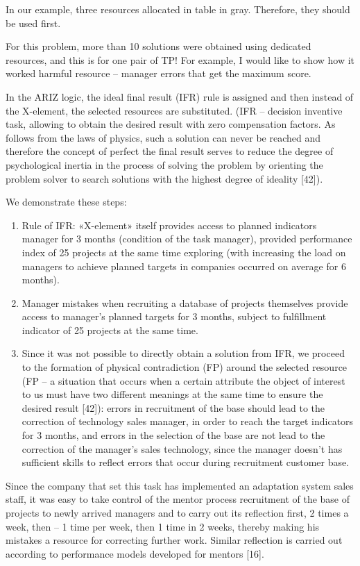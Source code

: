 \documentclass[11pt,a4paper]{book}
\begin{document}
In our example, three resources allocated in table in gray. Therefore, they
should be used first.

For this problem, more than 10 solutions were obtained using dedicated
resources, and this is for one pair of TP! For example, I would like to show
how it worked harmful resource -- manager errors that get the maximum score.

In the ARIZ logic, the ideal final result (IFR) rule is assigned and then
instead of the X-element, the selected resources are substituted. (IFR --
decision inventive task, allowing to obtain the desired result with zero
compensation factors. As follows from the laws of physics, such a solution can
never be reached and therefore the concept of perfect the final result serves
to reduce the degree of psychological inertia in the process of solving the
problem by orienting the problem solver to search solutions with the highest
degree of ideality [42]).

We demonstrate these steps:
\begin{enumerate}
\item Rule of IFR: «X-element» itself provides access to planned indicators
  manager for 3 months (condition of the task manager), provided performance
  index of 25 projects at the same time exploring (with increasing the load on
  managers to achieve planned targets in companies occurred on average for 6
  months).
\item Manager mistakes when recruiting a database of projects themselves
  provide access to manager's planned targets for 3 months, subject to
  fulfillment indicator of 25 projects at the same time.
\item Since it was not possible to directly obtain a solution from IFR, we
  proceed to the formation of physical contradiction (FP) around the selected
  resource (FP -- a situation that occurs when a certain attribute the object
  of interest to us must have two different meanings at the same time to
  ensure the desired result [42]): errors in recruitment of the base should
  lead to the correction of technology sales manager, in order to reach the
  target indicators for 3 months, and errors in the selection of the base are
  not lead to the correction of the manager’s sales technology, since the
  manager doesn’t has sufficient skills to reflect errors that occur during
  recruitment customer base.
\end{enumerate}
Since the company that set this task has implemented an adaptation system
sales staff, it was easy to take control of the mentor process recruitment of
the base of projects to newly arrived managers and to carry out its reflection
first, 2 times a week, then -- 1 time per week, then 1 time in 2 weeks,
thereby making his mistakes a resource for correcting further work. Similar
reflection is carried out according to performance models developed for
mentors [16].
\end{document}
